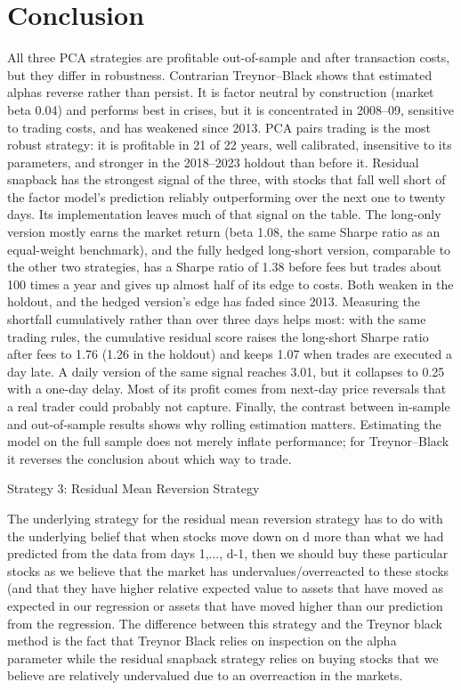 \documentclass[12pt,letterpaper]{article}
\begin{document}
\section{Conclusion}

All three PCA strategies are profitable out-of-sample and after transaction costs, but they differ in robustness. Contrarian Treynor--Black shows that estimated alphas reverse rather than persist. It is factor neutral by construction (market beta 0.04) and performs best in crises, but it is concentrated in 2008--09, sensitive to trading costs, and has weakened since 2013. PCA pairs trading is the most robust strategy: it is profitable in 21 of 22 years, well calibrated, insensitive to its parameters, and stronger in the 2018--2023 holdout than before it. Residual snapback has the strongest signal of the three, with stocks that fall well short of the factor model's prediction reliably outperforming over the next one to twenty days. Its implementation leaves much of that signal on the table. The long-only version mostly earns the market return (beta 1.08, the same Sharpe ratio as an equal-weight benchmark), and the fully hedged long-short version, comparable to the other two strategies, has a Sharpe ratio of 1.38 before fees but trades about 100 times a year and gives up almost half of its edge to costs. Both weaken in the holdout, and the hedged version's edge has faded since 2013. Measuring the shortfall cumulatively rather than over three days helps most: with the same trading rules, the cumulative residual score raises the long-short Sharpe ratio after fees to 1.76 (1.26 in the holdout) and keeps 1.07 when trades are executed a day late. A daily version of the same signal reaches 3.01, but it collapses to 0.25 with a one-day delay. Most of its profit comes from next-day price reversals that a real trader could probably not capture. Finally, the contrast between in-sample and out-of-sample results shows why rolling estimation matters. Estimating the model on the full sample does not merely inflate performance; for Treynor--Black it reverses the conclusion about which way to trade.


\quad

Strategy 3: Residual Mean Reversion Strategy

The underlying strategy for the residual mean reversion strategy has to do with the underlying belief that when stocks move down on d more than what we had predicted from the data from days 1,..., d-1, then we should buy these particular stocks as we believe that the market has undervalues/overreacted to these stocks (and that they have higher relative expected value to assets that have moved as expected in our regression or assets that have moved higher than our prediction from the regression. The difference between this strategy and the Treynor black method is the fact that Treynor Black relies on inspection on the alpha parameter while the residual snapback strategy relies on buying stocks that we believe are relatively undervalued due to an overreaction in the markets.
\end{document}

